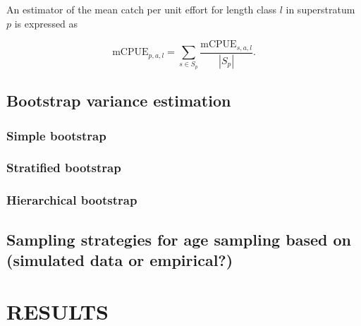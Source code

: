 \documentclass[a4paper 12pt]{article}
\numberwithin{equation}{section}
\begin{document}
An estimator of the mean catch per unit effort for length class $l$ in superstratum $p$ is expressed as


\begin{equation}
\mathrm{mCPUE}_{p,a,l} =  \sum\limits_{s \in S_{p}} \frac{\mathrm{mCPUE}_{s,a,l}}{|S_{p}|}.
\label{mcpueagerfa}
\end{equation}


\clearpage
\subsection{Bootstrap variance estimation}
\label{bootall}

\subsubsection{Simple bootstrap}
\label{simpleboot}


\subsubsection{Stratified bootstrap}
\label{stratboot}


\subsubsection{Hierarchical bootstrap}
\label{hierarboot}


\subsection{Sampling strategies for age sampling based on (simulated data or empirical?)}


\clearpage
\section{RESULTS}
\end{document}
